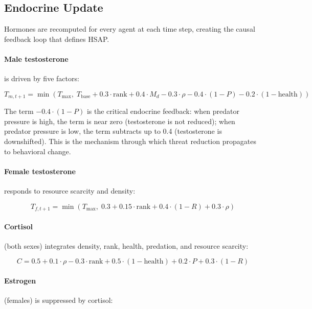\subsection{Endocrine Update}
\label{sec:endocrine}

Hormones are recomputed for every agent at each time step, creating the causal feedback loop that defines HSAP.

\paragraph{Male testosterone} is driven by five factors:

\begin{equation}
T_{m,t+1} = \min\left(T_{\max},\; T_{\text{base}} + 0.3 \cdot \text{rank} + 0.4 \cdot M_d - 0.3 \cdot \rho - 0.4 \cdot (1 - P) - 0.2 \cdot (1 - \text{health})\right)
\label{eq:male_T}
\end{equation}

The term $-0.4 \cdot (1 - P)$ is the critical endocrine feedback: when predator pressure is high, the term is near zero (testosterone is not reduced); when predator pressure is low, the term subtracts up to 0.4 (testosterone is downshifted). This is the mechanism through which threat reduction propagates to behavioral change.

\paragraph{Female testosterone} responds to resource scarcity and density:

\begin{equation}
T_{f,t+1} = \min\left(T_{\max},\; 0.3 + 0.15 \cdot \text{rank} + 0.4 \cdot (1 - R) + 0.3 \cdot \rho\right)
\label{eq:female_T}
\end{equation}

\paragraph{Cortisol} (both sexes) integrates density, rank, health, predation, and resource scarcity:

\begin{equation}
C = 0.5 + 0.1 \cdot \rho - 0.3 \cdot \text{rank} + 0.5 \cdot (1 - \text{health}) + 0.2 \cdot P + 0.3 \cdot (1 - R)
\label{eq:cortisol}
\end{equation}

\paragraph{Estrogen} (females) is suppressed by cortisol:

